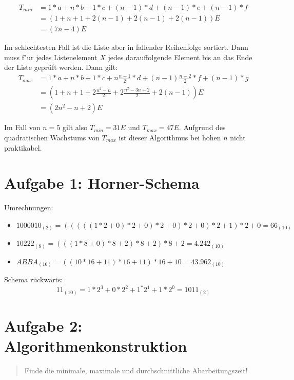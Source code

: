 \documentclass{article}
\begin{document}
    \begin{align*}
        T_{min} &= 1*a + n*b + 1*c + (n-1)*d + (n-1)*e + (n-1)*f \\
        &= (1 + n + 1 + 2(n-1) + 2(n-1) + 2(n-1))E \\
        &= (7n-4)E
    \end{align*}

    Im schlechtesten Fall ist die Liste aber in fallender Reihenfolge sortiert. Dann muss f"ur jedes Listenelement $X$ jedes 
    darauffolgende Element bis an das Ende der Liste geprüft werden. Dann gilt:
    \begin{align*}
        T_{max} &= 1*a + n*b + 1*c + n\frac{n-1}{2}*d + (n-1)\frac{n-2}{2}*f + (n-1)*g \\
        &= (1 + n + 1 + 2\frac{n^2-n}{2} + 2\frac{n^2-3n+2}{2} + 2(n-1))E\\
        &= (2n^2 - n + 2)E
    \end{align*}

    Im Fall von $n=5$ gilt also $T_{min}=31E$ und $T_{max}=47E$. Aufgrund des quadratischen Wachstums von $T_{max}$ ist dieser
    Algorithmus bei hohen $n$ nicht praktikabel. 



    \section*{Aufgabe 1: Horner-Schema}
    Umrechnungen:
    \begin{itemize}
        \item $1000010_{(2)} = (((((1*2+0)*2+0)*2+0)*2+0)*2+1)*2+0 = 66_{(10)}$ \\
        \item $10222_{(8)} = (((1*8+0)*8+2)*8+2)*8+2 = 4.242_{(10)}$ \\
        \item $ABBA_{(16)} = ((10*16+11)*16+11)*16+10 = 43.962_{(10)}$
    \end{itemize}
    Schema rückwärts:
    \begin{equation*}
        11_{(10)} = 1*2^3+0*2^2+1^*2^1+1*2^0 = 1011_{(2)}
    \end{equation*}



    \section*{Aufgabe 2: Algorithmenkonstruktion}
    \begin{quotation}
        Finde die minimale, maximale und durchschnittliche Abarbeitungszeit! 
    \end{quotation}
\end{document}
